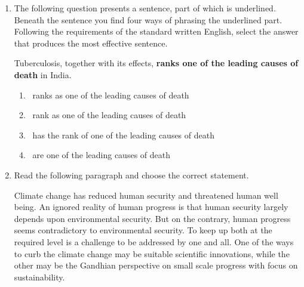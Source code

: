 \documentclass[journal,12pt,onecolumn]{exam}
\theoremstyle{remark}
\newcommand{\cross}{\textcolor{wrongred}{\ding{55}}}
\newcommand{\tick}{\textcolor{correctgreen}{\ding{51}}}
\begin{document}
\begin{enumerate}
 

\item

The following question presents a sentence, part of which is underlined. Beneath the sentence you find four ways of phrasing the underlined part. Following the requirements of the standard written English, select the answer that produces the most effective sentence.

 

Tuberculosis, together with its effects, \textbf{ranks one of the leading causes of death} in India.

 

\hfill{}

 

\begin{multicols}{4}
 \begin{enumerate}
    \item \textcolor{correctgreen}{\tick\ ranks as one of the leading causes of death}
    \item \textcolor{wrongred}{\cross\ rank as one of the leading causes of death}
    \item \textcolor{wrongred}{\cross\ has the rank of one of the leading causes of death}
    \item \textcolor{wrongred}{\cross\ are one of the leading causes of death}
\end{enumerate}
\end{multicols}

 




\item

Read the following paragraph and choose the correct statement.

Climate change has reduced human security and threatened human well being. An ignored reality of human progress is that human security largely depends upon environmental security. But on the contrary, human progress seems contradictory to environmental security. To keep up both at the required level is a challenge to be addressed by one and all. One of the ways to curb the climate change may be suitable scientific innovations, while the other may be the Gandhian perspective on small scale progress with focus on sustainability.

 

\hfill{}

 


\end{enumerate}
\end{document}
